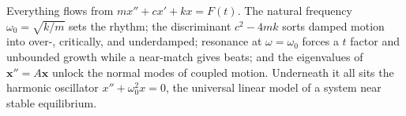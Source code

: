 \begin{conceptbox}
Everything flows from $m x'' + c x' + k x = F(t)$. The
\textcolor{accentorange}{natural frequency $\omega_0=\sqrt{k/m}$} sets the rhythm;
the \textcolor{accentorange}{discriminant $c^2-4mk$} sorts damped motion into
over-, critically, and underdamped; \textcolor{accentorange}{resonance at
$\omega=\omega_0$} forces a $t$ factor and unbounded growth while a near-match gives
\textcolor{accentorange}{beats}; and the \textcolor{accentorange}{eigenvalues of
$\mathbf{x}''=A\mathbf{x}$} unlock the normal modes of coupled motion. Underneath it
all sits the \textcolor{accentorange}{harmonic oscillator $x''+\omega_0^2 x=0$}, the
universal linear model of a system near stable equilibrium.
\end{conceptbox}


